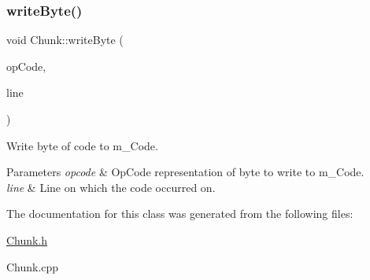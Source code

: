 \subsubsection{\texorpdfstring{write\+Byte()}{writeByte()}\hspace{0.1cm}{\footnotesize\ttfamily [2/2]}}
{\footnotesize\ttfamily void Chunk\+::write\+Byte (\begin{DoxyParamCaption}\item[{\hyperlink{_chunk_8h_a3d7c5cec8d9c1afc2c92ad39b9d64996}{Op\+Code}}]{op\+Code,  }\item[{int}]{line }\end{DoxyParamCaption})\hspace{0.3cm}{\ttfamily [inline]}}



Write byte of code to m\+\_\+\+Code. 


\begin{DoxyParams}{Parameters}
{\em opcode} & Op\+Code representation of byte to write to m\+\_\+\+Code. \\
\hline
{\em line} & Line on which the code occurred on. \\
\hline
\end{DoxyParams}


The documentation for this class was generated from the following files\+:\begin{DoxyCompactItemize}
\item 
\hyperlink{_chunk_8h}{Chunk.\+h}\item 
Chunk.\+cpp\end{DoxyCompactItemize}
